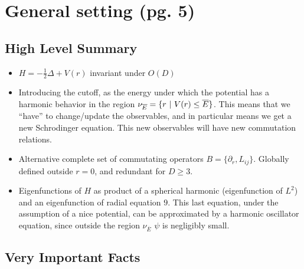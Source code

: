 \documentclass{article}
\newcommand{\cut}[1]{\overline{#1}}
\begin{document}
\section{General setting (pg. 5)}

\subsection*{High Level Summary}

    \begin{itemize}

    \item $H = - \frac{1}{2} \Delta + V(r)$ invariant under $O(D)$
    
    \item Introducing the cutoff, as the energy under which the potential has a harmonic behavior in the region $\nu_{\cut E} = \{r \st V(r) \leq \cut E\}$. This means that we ``have'' to change/update the observables, and in particular means we get a new Schrodinger equation. This new observables will have new commutation relations.
    
    \item Alternative complete set of commutating operators $B = \{\partial_r, L_{ij}\}$. Globally defined outside $r = 0$, and redundant for $D \geq 3$.
    
    \item Eigenfunctions of $H$ as product of a spherical harmonic (eigenfunction of $L^2$) and an eigenfunction of radial equation $9$. This last equation, under the assumption of a nice potential, can be approximated by a harmonic oscillator equation, since outside the region $\nu_{\cut E}$ $\psi$ is negligibly small.
    
    \end{itemize}

\subsection*{Very Important Facts}
\end{document}
